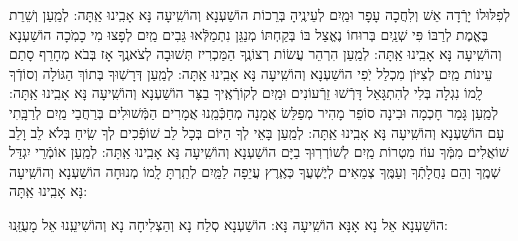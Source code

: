 \documentclass[twoside, openany, parskip=half, 11pt]{book}
\begin{document}
\begin{small}
	לְפִלּוּלוֹ יָרְֿדָה אֵשׁ וְלִחֲכָה עָפָר וּמַֽיִם לְעֵינֶֽיהָ בְּרֵכוֹת 	הוֹשַׁעְנָא וְהוֹשִֽׁיעָה נָּא אָבִֽינוּ אַֽתָּה:
לְמַֽעַן וְשֵׁרֵת בֶּאֱמֶת לְרַבּוֹ פִּי שְׁנַֽיִם בְּרוּחוֹ נֶאֱצַל בּוֹ 
	בְּקַחְתּוֹ מְנַגֵּן נִתְמַלְּֿאוּ גֵּבִים מַֽיִם לְפָצוּ מִי כָמֹֽכָה 	הוֹשַׁעְנָא וְהוֹשִֽׁיעָה נָּא אָבִֽינוּ אַֽתָּה:
לְמַֽעַן הִרְהֵר עֲשׂוֹת רְצוֹנֶֽךָ הַמַּכְרִיז תְּשׁוּבָה לְצֹאנֶֽךָ 
	אָז בְּבֹא מְחָרֵף סָתַם עֵינוֹת מַֽיִם לְצִיּוֹן מִכְלַל יֹֽפִי 	הוֹשַׁעְנָא וְהוֹשִֽׁיעָה נָּא אָבִֽינוּ אַֽתָּה:
לְמַֽעַן דְּרָשֽׁוּךָ בְּתוֹךְ הַגּוֹלָה וְסוֹדְֿךָ לָֽמוֹ נִגְלָה 
	בְּלִי לְהִתְגָּאֵל דָּרְֿשׁוּ זֵרְֿעוֹנִים וּמַֽיִם לְקוֹרְֿאֶֽיךָ בַצָּר 	הוֹשַׁעְנָא וְהוֹשִֽׁיעָה נָּא אָבִֽינוּ אַֽתָּה:
לְמַֽעַן גָּמַר חָכְמָה וּבִינָה סוֹפֵר מָהִיר מְפַלֵּשׂ אֲמָנָה 
	מְחַכְּֿמֵֽנוּ אֲמָרִים הַמְּֿשׁוּלִים בְּרַחֲבֵי מַֽיִם לְרַבָּֽתִי עָם 	הוֹשַׁעְנָא וְהוֹשִֽׁיעָה נָּא אָבִֽינוּ אַֽתָּה:
לְמַֽעַן בָּאֵי לְךָ הַיּוֹם בְּכָל לֵב שׁוֹפְֿכִים לְךָ שִֽׂיחַ בְּלֹא לֵב וָלֵב 
	שׁוֹאֲלִים מִמְּֿךָ עוֹז מִטְרוֹת מַֽיִם לְשׁוֹרְרֽוּךָ בַיָּם 	הוֹשַׁעְנָא וְהוֹשִֽׁיעָה נָּא אָבִֽינוּ אַֽתָּה:
לְמַֽעַן אוֹמְֿרֵי יִגְדַּל שְׁמֶֽךָ וְהֵם נַחֲלָתְֿךָ וְעַמֶּֽךָ 
	צְמֵאִים לְיֶשְׁעֲךָ כְּאֶֽרֶץ עֲיֵפָה לַמַּֽיִם לְתַֽרְתָּ לָֽמוֹ מְנוּחָה 	הוֹשַׁעְנָא וְהוֹשִֽׁיעָה נָּא אָבִֽינוּ אַֽתָּה:
	
\end{small}

\begin{large}
\shatzvkahal
 הוֹשַׁעְנָא אֵל נָא אָנָּא הוֹשִֽׁיעָה נָּא:
הוֹשַׁעְנָא סְלַח נָא וְהַצְלִיחָה נָא וְהוֹשִׁיעֵֽנוּ אֵל מָעֻזֵּֽנוּ:

\end{large}
\end{document}
